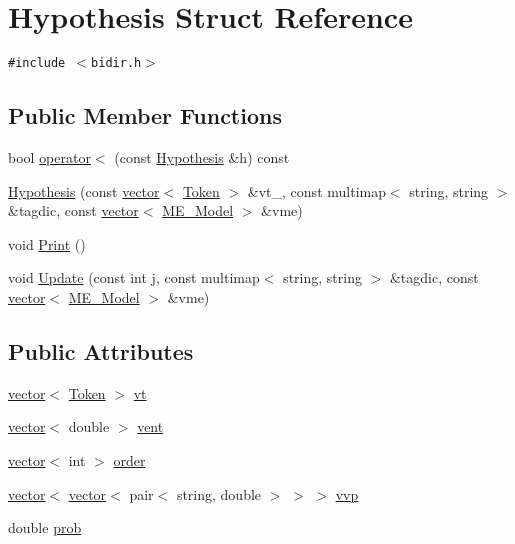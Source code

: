 \hypertarget{structHypothesis}{
\section{Hypothesis Struct Reference}
\label{structHypothesis}
}
{\tt \#include $<$bidir.h$>$}

\subsection*{Public Member Functions}
\begin{CompactItemize}
\item 
bool \hyperlink{structHypothesis_8ddf211bd1d982dcf7256bb8b87b46f4}{operator$<$} (const \hyperlink{structHypothesis}{Hypothesis} \&h) const 
\item 
\hyperlink{structHypothesis_83ba05ec1c34ffa81137fcefaad9054c}{Hypothesis} (const \hyperlink{classstd_1_1vector}{vector}$<$ \hyperlink{structToken}{Token} $>$ \&vt\_\-, const multimap$<$ string, string $>$ \&tagdic, const \hyperlink{classstd_1_1vector}{vector}$<$ \hyperlink{classME__Model}{ME\_\-Model} $>$ \&vme)
\item 
void \hyperlink{structHypothesis_8b727811ecdc043196ccb2443f0926fd}{Print} ()
\item 
void \hyperlink{structHypothesis_890db467cee870f4f2bbaab38a1c7dcf}{Update} (const int j, const multimap$<$ string, string $>$ \&tagdic, const \hyperlink{classstd_1_1vector}{vector}$<$ \hyperlink{classME__Model}{ME\_\-Model} $>$ \&vme)
\end{CompactItemize}
\subsection*{Public Attributes}
\begin{CompactItemize}
\item 
\hyperlink{classstd_1_1vector}{vector}$<$ \hyperlink{structToken}{Token} $>$ \hyperlink{structHypothesis_358eab95366fb8cbe00d0ce77a2cba0c}{vt}
\item 
\hyperlink{classstd_1_1vector}{vector}$<$ double $>$ \hyperlink{structHypothesis_71d6219f3db132b8f8cb6c1a74ee8e50}{vent}
\item 
\hyperlink{classstd_1_1vector}{vector}$<$ int $>$ \hyperlink{structHypothesis_52746abb6a7c86a554f65544457b604b}{order}
\item 
\hyperlink{classstd_1_1vector}{vector}$<$ \hyperlink{classstd_1_1vector}{vector}$<$ pair$<$ string, double $>$ $>$ $>$ \hyperlink{structHypothesis_6fc223c39b3b4589c72ef511d9c2dcc7}{vvp}
\item 
double \hyperlink{structHypothesis_b713fec07803264399fd86adfa5800fd}{prob}
\end{CompactItemize}


